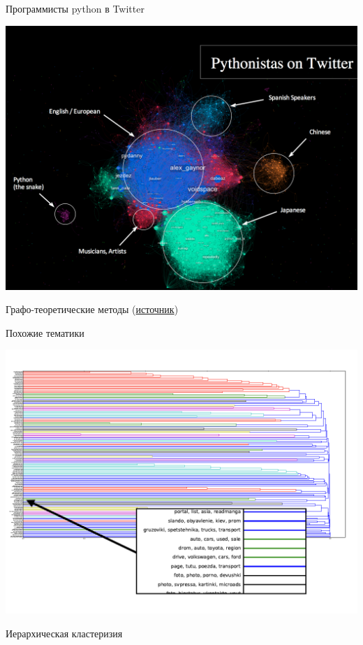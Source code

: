 \documentclass[10pt]{beamer}
\begin{document}
\begin{frame}{Программисты python в Twitter}

\begin{center}
\includegraphics[scale=0.15]{images/python.png}
\end{center}
Графо-теоретические методы
(\href{http://giladlotan.com/2012/11/mapping-twitters-python-data-science-communities/}{источник})

\end{frame}

\begin{frame}{Похожие тематики}

\begin{center}
\includegraphics[scale=0.25]{images/hier.png}
\end{center}
Иерархическая кластеризия

\end{frame}
\end{document}
